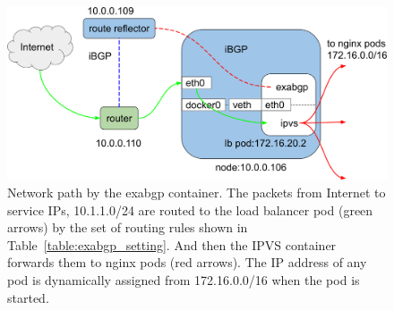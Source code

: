 \begin{figure}[tb]
  \centering
  \includegraphics[width=0.8\columnwidth]{Figs/exabgp}
  
  \par\bigskip
  \centering
  \begin{minipage}{0.9\columnwidth}
    \caption[Network path by the exabgp container]{
      Network path by the exabgp container.
      The packets from Internet to service IPs, 10.1.1.0/24 are routed to the load balancer pod (green arrows) by the set of routing rules shown in Table~\ref{table:exabgp_setting}.
      And then the IPVS container forwards them to nginx pods (red arrows).
      The IP address of any pod is dynamically assigned from 172.16.0.0/16 when the pod is started. 
    }
    \label{fig:exabgp_schem}
  \end{minipage}

\end{figure}

